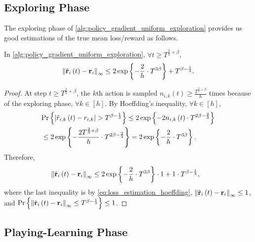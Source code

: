 \subsection{Exploring Phase}
\label{subsec:exploring_phase}

The exploring phase of \cref{alg:policy_gradient_uniform_exploration} provides us good estimations of the true mean loss/reward as follows.
\begin{thm}
\label{thm:loss_estimation_hoeffding}
    In \cref{alg:policy_gradient_uniform_exploration}, $\forall t \ge T^{\frac{2}{3} + \beta}$,
\begin{equation*}
    \left\| \hat{{\mathbf{r}}}_i\left(t\right) - {\mathbf{r}}_i \right\|_\infty \le 2 \exp\left\{ - \frac{2}{h} \cdot  T^{3\beta} \right\} + T^{\beta - \frac{1}{3}}.
\end{equation*}
\end{thm}
\begin{proof}
    At step $t \ge T^{\frac{2}{3} + \beta}$, the $k$th action is sampled $n_{i, k}\left(t\right) \ge \frac{T^{\frac{2}{3} + \beta} }{h}$ times because of the exploring phase, $\forall k \in [h]$. By Hoeffding's inequality, $\forall k \in [h]$,
\begin{equation}
\label{eq:loss_estimation_hoeffding}
\begin{split}
    &{\text{Pr}}\left\{ \left| \hat{r}_{i, k}\left(t\right) - r_{i,k} \right| > T^{\beta - \frac{1}{3}} \right\} \le 2 \exp\left\{ - 2 n_{i, k}\left(t\right) \cdot T^{2\beta - \frac{2}{3}} \right\} \\
    &\le 2 \exp\left\{ -  \frac{2 T^{\frac{2}{3} + \beta}}{h} \cdot T^{2\beta - \frac{2}{3}} \right\} = 2 \exp\left\{ - \frac{2}{h} \cdot  T^{3\beta} \right\}.
\end{split}
\end{equation}
Therefore,
\begin{equation*}
\begin{split}
    &\left\| \hat{{\mathbf{r}}}_i\left(t\right) - {\mathbf{r}}_i \right\|_\infty \le 2 \exp\left\{ - \frac{2}{h} \cdot  T^{3\beta} \right\} \cdot 1 + 1 \cdot T^{\beta - \frac{1}{3}},
\end{split}
\end{equation*}
where the last inequality is by \cref{eq:loss_estimation_hoeffding}, $\left\| \hat{{\mathbf{r}}}_i\left(t\right) - {\mathbf{r}}_i \right\|_\infty \le 1$, and ${\text{Pr}}\left\{ \left\| \hat{{\mathbf{r}}}_i\left(t\right) - {\mathbf{r}}_i \right\|_\infty \le T^{\beta - \frac{1}{3}} \right\} \le 1$. 
\end{proof}

\subsection{Playing-Learning Phase}
\label{subsec:playing_learning_phase}

